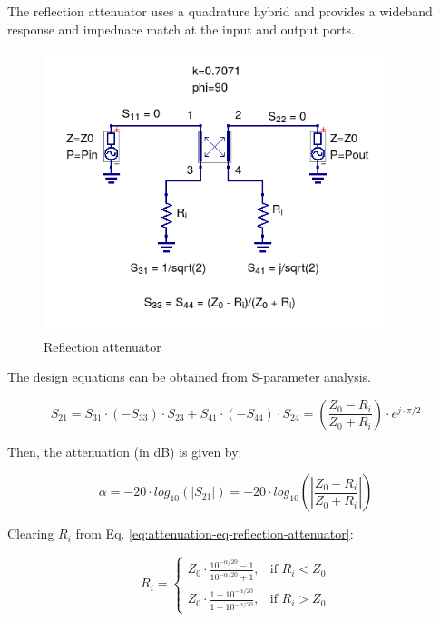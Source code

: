 \noindent The reflection attenuator \cite{pin_diode_designer_handbook} uses a quadrature hybrid and provides a wideband response and impednace match at the input and output ports.

  \begin{figure}[ht]
    \centering
    \includegraphics[width=10cm]{./images/reflection-attenuator-schematic.png}
    \caption{Reflection attenuator}
    \label{fig:reflection-attenuator-schematic}
  \end{figure}
  
\noindent The design equations can be obtained from S-parameter analysis.
  
  \begin{equation}
  S_{21} = S_{31} \cdot (-S_{33}) \cdot S_{23} + S_{41} \cdot (-S_{44}) \cdot S_{24} = \left( \frac{Z_0 - R_i}{Z_0 + R_i} \right) \cdot e^{j \cdot \pi/2}
  \end{equation}
  
\noindent Then, the attenuation (in dB) is given by:
  
  \begin{equation}
  	 \alpha = -20 \cdot log_{10} \left( \lvert S_{21} \rvert \right) = -20 \cdot log_{10} \left( \left| \frac{Z_0 - R_i}{Z_0 + R_i} \right| \right)
  	 \label{eq:attenuation-eq-reflection-attenuator}
  \end{equation}
  
\noindent Clearing $R_i$ from Eq. \ref{eq:attenuation-eq-reflection-attenuator}:
  
  \begin{equation}
  R_i = \begin{cases} Z_0 \cdot \frac{10^{-\alpha/20} - 1}{10^{-\alpha/20} + 1}, & \text{if  } R_i <  Z_0 \\ Z_0 \cdot \frac{1 + 10^{-\alpha/20}}{1 - 10^{-\alpha/20}}, & \text{if  } R_i > Z_0 \end{cases}
  \end{equation}
  
